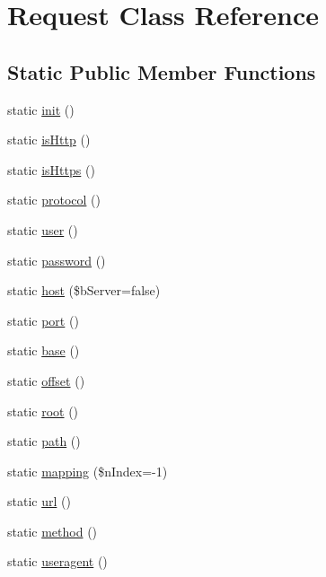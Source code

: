 \hypertarget{class_request}{\section{Request Class Reference}
\label{class_request}
}
\subsection*{Static Public Member Functions}
\begin{DoxyCompactItemize}
\item 
static \hyperlink{class_request_a0552dcea819c77f239bb6db060e17b47}{init} ()
\item 
static \hyperlink{class_request_a8d58147bb9572424021c44b0ebb3f85a}{is\-Http} ()
\item 
static \hyperlink{class_request_afab6f7cb93efa72b28f3e8b2eba901dd}{is\-Https} ()
\item 
static \hyperlink{class_request_a806349a06939db0150ce9d7d3e6f54f5}{protocol} ()
\item 
static \hyperlink{class_request_a512dd9b95abef2346ad3af2e593d10c1}{user} ()
\item 
static \hyperlink{class_request_a1ad0dec68fffe32c3b59e5130b63c1ba}{password} ()
\item 
static \hyperlink{class_request_a291eeae48e2675a5301279b0e1b8d8e2}{host} (\$b\-Server=false)
\item 
static \hyperlink{class_request_a495e06b9d24638c678259b6f3aefbcd6}{port} ()
\item 
static \hyperlink{class_request_aca04f9b433bb568c10d32ee114a0d02c}{base} ()
\item 
static \hyperlink{class_request_a64f9327ac4a815b3f114d50fd6ba521b}{offset} ()
\item 
static \hyperlink{class_request_a6b69986e47c94186cce2336f11ad1f6e}{root} ()
\item 
static \hyperlink{class_request_ae1725b521b1833602f3f554566142c51}{path} ()
\item 
static \hyperlink{class_request_ada5f08ac6d1754ad0cc7312c10b8c9a3}{mapping} (\$n\-Index=-\/1)
\item 
static \hyperlink{class_request_abf1e0caab3f4027d508eec81489b260b}{url} ()
\item 
static \hyperlink{class_request_a4d6813e2943a1ced4ae7159e3a382695}{method} ()
\item 
static \hyperlink{class_request_a12099938e1500f4559b32b833de2088e}{useragent} ()
\item 

\end{DoxyCompactItemize}
